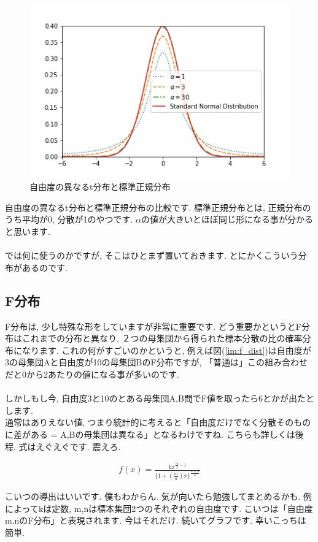 \documentclass[11pt,a4paper]{jsarticle}                    %
\begin{document}
\begin{figure}[H]
\label{im:student}
  \centering
  \includegraphics[width=120mm,bb=0 0 432 288]{../figures/student.png}
  \caption{自由度の異なるt分布と標準正規分布}
\end{figure}
自由度の異なるt分布と標準正規分布の比較です. 標準正規分布とは, 正規分布のうち平均が0, 分散が1のやつです. $\alpha$の値が大きいとほぼ同じ形になる事が分かると思います.\\
\\
では何に使うのかですが, そこはひとまず置いておきます. とにかくこういう分布があるのです.


\subsection{F分布}
F分布は, 少し特殊な形をしていますが非常に重要です. どう重要かというとF分布はこれまでの分布と異なり, ２つの母集団から得られた標本分散の比の確率分布になります. これの何がすごいのかというと, 例えば図(\ref{im:f_dist})は自由度が3の母集団Aと自由度が10の母集団BのF分布ですが, 「普通は」この組み合わせだと0から2あたりの値になる事が多いのです. \\
\\
しかしもし今, 自由度3と10のとある母集団A,B間でF値を取ったら6とかが出たとします. \\
通常はありえない値, つまり統計的に考えると「自由度だけでなく分散そのものに差がある = A,Bの母集団は異なる」となるわけですね. こちらも詳しくは後程. 式はえぐえぐです. 震えろ.

\begin{eqnarray}
f(x) = \frac{kx^{\frac{m}{2}-1}}{\{1 + (\frac{m}{n})x\}^{\frac{m+n}{2}}}
\end{eqnarray}

こいつの導出はいいです. 僕もわからん. 気が向いたら勉強してまとめるかも. 例によってkは定数, m,nは標本集団2つのそれぞれの自由度です. こいつは「自由度m,nのF分布」と表現されます. 今はそれだけ. 続いてグラフです. 幸いこっちは簡単.
\end{document}
